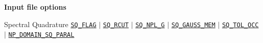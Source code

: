\begin{frame}[allowframebreaks]{\textbf{Input file options}} \label{Index}
\vspace{-2mm}
 \begin{block}{Spectral Quadrature}
\hyperlink{SQ_FLAG}{\texttt{SQ\_FLAG}} $\vert$ 
\hyperlink{SQ_RCUT}{\texttt{SQ\_RCUT}} $\vert$ 
\hyperlink{SQ_NPL_G}{\texttt{SQ\_NPL\_G}}  $\vert$ 
\hyperlink{SQ_GAUSS_MEM}{\texttt{SQ\_GAUSS\_MEM}} $\vert$ 
\hyperlink{SQ_TOL_OCC}{\texttt{SQ\_TOL\_OCC}} $\vert$ 
\hyperlink{NP_DOMAIN_SQ_PARAL}{\texttt{NP\_DOMAIN\_SQ\_PARAL}} 
\end{block}

\end{frame}

